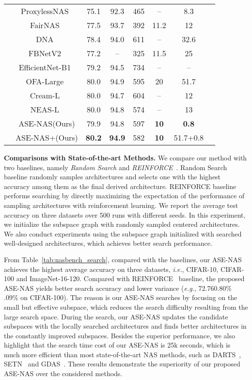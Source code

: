 \documentclass[lettersize,journal]{IEEEtran}
\newcommand{\sexyname}{ASE-NAS\xspace}
\newcommand{\sexynameplus}{ASE-NAS+\xspace}
\newcommand{\bottomline}{\bottomrule [0.1em]}
\def\eg{\emph{e.g.}} \def\Eg{\emph{E.g.}}
\def\ie{\emph{i.e.}} \def\Ie{\emph{I.e.}}
\begin{document}
\begin{table*}[t]
{{\begin{tabular}{c|ccccccc}
& ProxylessNAS~\cite{cai2018proxylessnas} & 75.1 & 92.3  & 465 & -- & 8.3\\
& FairNAS~\cite{chu2021fairnas} & 77.5 & 93.7 & 392 & 11.2 & 12 \\
    & DNA~\cite{li2020block}& 78.4 & 94.0 & 611 & -- & 32.6 \\
    & FBNetV2~\cite{FBNETV2} & 77.2 & --  & 325 & 11.5 & 25\\
& EfficientNet-B1~\cite{EfficientNet}& 79.2 & 94.5 & 734 & -- & --\\
    & OFA-Large~\cite{Cai2020Once} & 80.0 & 94.9  & 595 & 20 & 51.7\\
    & Cream-L~\cite{peng2020cream} & 80.0 & 94.7 & 604 & -- & 12\\
    & NEAS-L~\cite{chen2021oneshot} & 80.0 & 94.8 & 574 & -- & 13 \\
    & \sexyname (Ours) & 79.9 & 94.8 & 597 & \textbf{10} & \textbf{0.8}\\
    & \sexynameplus (Ours) & \textbf{80.2} & \textbf{94.9} & 582 & \textbf{10} & 51.7+0.8\\
    \bottomline
    \end{tabular}
    }
    }
	\label{tab:imagenet}
\end{table*}

\textbf{Comparisons with State-of-the-art Methods.}
We compare our method with two baselines, namely \textit{Random Search} and \textit{REINFORCE}~\cite{williams1992simple}. 
Random Search baseline randomly samples architectures and selects one with the highest accuracy among them as the final derived architecture.
REINFORCE baseline performs searching by directly maximizing the expectation of the performance of sampling architectures with reinforcement learning.
We report the average test accuracy on three datasets over 500 runs with different seeds.
In this experiment, we initialize the subspace graph with randomly sampled centered architectures.
We also conduct experiments using the subspace graph initialized with searched well-designed architectures, which achieves better search performance.

From Table~\ref{tab:nasbench_search}, compared with the baselines, our \sexyname achieves the highest average accuracy on three datasets, \ie, CIFAR-10, CIFAR-100 and ImageNet-16-120.
Compared with REINFORCE~\cite{williams1992simple} baseline, the proposed \sexyname yields better search accuracy and lower variance (\eg, 72.760.80\% .09\% on CIFAR-100).
The reason is our \sexyname searches by focusing on the small but effective subspace, which reduces the search difficulty resulting from the large search space.
During the search, our \sexyname updates the candidate subspaces with the locally searched architectures and finds better architectures in the constantly improved subspaces.
Besides the superior performance, we also highlight that the search time cost of our \sexyname is 25k seconds, which is much more efficient than most state-of-the-art NAS methods, such as DARTS~\cite{liu2018darts}, SETN~\cite{dong2019oneshot} and GDAS~\cite{dong2019searching}.
These results demonstrate the superiority of our proposed \sexyname over the considered methods.
\end{document}
